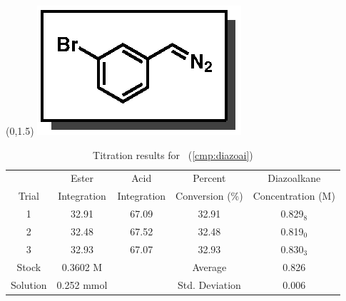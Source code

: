 \begin{singlespace}
\begin{table}[htbp]
\begin{textblock}{1}(0,1.5)
\includegraphics[scale=0.8]{chp_asymmetric/images/diazoai}
\end{textblock}
\flushright
{\small
\begin{tabular}{ccccc} 
\toprule
&Ester&Acid&Percent&Diazoalkane\\
Trial&Integration&Integration&Conversion (\%)&Concentration (M) \\ 
\midrule
1 & 32.91 & 67.09 & 32.91 & 0.829$_8$ \\
2 & 32.48 & 67.52 & 32.48 & 0.819$_0$ \\
3 & 32.93 & 67.07 & 32.93 & 0.830$_3$ \\
\midrule
Stock & 0.3602 M & & Average & 0.826 \\
Solution & 0.252 mmol & & Std. Deviation & 0.006 \\
\bottomrule
\end{tabular}
\caption{Titration results for \CMPdiazoai~(\ref{cmp:diazoai})}
}
\end{table}
\end{singlespace}

